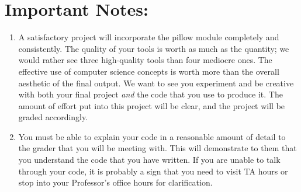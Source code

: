 \documentclass[11pt, letterpaper, onecolumn, oneside, final]{article}
\begin{document}
    \section{Important Notes:} 
    \begin{enumerate}
        \item A satisfactory project will incorporate the {\consolas pillow} module completely and consistently. The quality of your tools is worth as much as the quantity; we would rather see three high-quality tools than four mediocre ones. The effective use of computer science concepts is worth more than the overall aesthetic of the final output. We want to see you experiment and be creative with both your final project \emph{and} the code that you use to produce it. The amount of effort put into this project will be clear, and the project will be graded accordingly.
        \item You must be able to explain your code in a reasonable amount of detail to the grader that you will be meeting with. This will demonstrate to them that you understand the code that you have written. If you are unable to talk through your code, it is probably a sign that you need to visit TA hours or stop into your Professor's office hours for clarification. 
    \end{enumerate}

    
\end{document}
